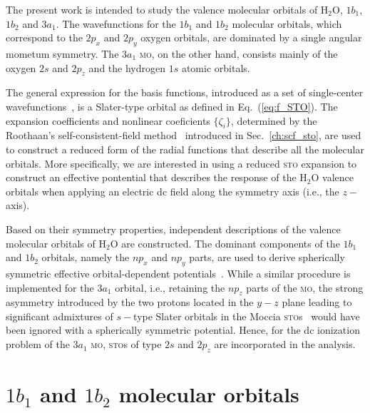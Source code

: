 The present work is intended to study the valence molecular orbitals
of H$_{2}$O, $1b_{1}$, $1b_{2}$ and $3a_{1}$. The wavefunctions for
the $1b_{1}$ and $1b_{2}$ molecular orbitals, which correspond to the
$2p_{x}$ and $2p_{y}$ oxygen orbitals, are dominated by a single
angular mometum symmetry. The $3a_{1}$ \textsc{mo}, on the other hand,
consists mainly of the oxygen $2s$ and $2p_{z}$ and the hydrogen $1s$
atomic orbitals.

The general expression for the basis functions, introduced as a set of
single-center
wavefunctions~\cite{Moccia_1964,Moccia_JCP_2164,Moccia_JCP_2176}, is a
Slater-type orbital as defined in Eq.~(\ref{eq:f_STO}). The expansion
coefficients and nonlinear coeficients $\{\zeta_{i}\}$, determined by
the Roothaan's self-consistent-field
method~\cite{Moccia_1964,Roothaan_1951} introduced in
Sec.~\ref{ch:scf_sto}, are used to construct a reduced form of the
radial functions that describe all the molecular orbitals. More
specifically, we are interested in using a reduced \textsc{sto}
expansion to construct an effective pontential that describes the
response of the H$_{2}$O valence orbitals when applying an electric dc
field along the symmetry axis (i.e., the $z-$axis).

Based on their symmetry properties, independent descriptions of the
valence molecular orbitals of H$_{2}$O are constructed. The dominant
components of the $1b_{1}$ and $1b_{2}$ orbitals, namely the $np_{x}$
and $np_{y}$ parts, are used to derive spherically symmetric effective
orbital-dependent potentials~\cite{sarias_2016}. While a similar
procedure is implemented for the $3a_{1}$ orbital, i.e., retaining the
$np_{z}$ parts of the \textsc{mo}, the strong asymmetry introduced by
the two protons located in the $y-z$ plane leading to significant
admixtures of $s-$type Slater orbitals in the Moccia
\textsc{sto}s~\cite{Moccia_1964} would have been ignored with a
spherically symmetric potential. Hence, for the dc ionization problem
of the $3a_{1}$ \textsc{mo}, \textsc{sto}s of type $2s$ and $2p_{z}$
are incorporated in the analysis.



\section{$1b_{1}$ and $1b_{2}$ molecular orbitals}
\label{ch:1b1_1b2}

